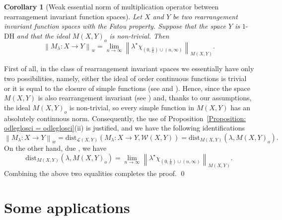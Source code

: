 \documentclass[11pt]{amsart}
\theoremstyle{definition}
\theoremstyle{definition}
\theoremstyle{definition}
\newtheorem{corollary}[theorem]{Corollary}
\theoremstyle{definition}
\theoremstyle{definition}
\theoremstyle{definition}
\theoremstyle{definition}
\theoremstyle{definition}
\numberwithin{equation}{section}
\numberwithin{equation}{section}
\numberwithin{equation}{section}
\theoremstyle{definition}
\theoremstyle{definition}
\theoremstyle{definition}
\theoremstyle{definition}
\theoremstyle{definition}
\theoremstyle{definition}
\newcommand{\norm}[1]{\left\lVert#1\right\rVert}
\renewenvironment{proof}{\noindent {\bf Proof.}}{\qed}
\begin{document}
\begin{corollary}[Weak essential norm of multiplication operator between rearrangement invariant function spaces] \label{COR: ess r.i. function}
	{\it Let $X$ and $Y$ be two rearrangement invariant function spaces with the Fatou property.
	Suppose that the space $Y$ is} $1$-DH {\it and that the ideal $M(X,Y)_o$ is non-trivial. Then}
	\begin{equation} \label{EQ: weak ess norm in r.i.}
		\norm{M_{\lambda} \colon X \rightarrow Y}_{w} = \lim\limits_{n \rightarrow \infty} \norm{\lambda^{\star} \chi_{\left( 0,\frac{1}{n} \right) \cup (n, \infty)}}_{M(X,Y)}.
	\end{equation}
\end{corollary}
\begin{proof}
	First of all, in the class of rearrangement invariant spaces we essentially have only two possibilities, namely, either the ideal of order continuous
	functions is trivial or it is equal to the closure of simple functions (see \cite[Theorem~5.5, pp.~67--68]{BS88} and \cite[Theorem~B]{KT17}). Hence,
	since the space $M(X,Y)$ is also rearrangement invariant (see \cite[Theorem~2.2(i)]{KLM12}) and, thanks to our assumptions, the ideal $M(X,Y)_o$ is non-trivial,
	so every simple function in $M(X,Y)$ has an absolutely continuous norm. Consequently, the use of Proposition~\ref{Proposition: odleglosci = odleglosci}(ii)
	is justified, and we have the following identifications
	\begin{equation*}
		\norm{M_{\lambda} \colon X \rightarrow Y}_{w} = \text{dist}_{\mathscr{L}(X,Y)}(M_{\lambda} \colon X \rightarrow Y, {\mathscr W}(X,Y))
			= \text{dist}_{M(X,Y)}(\lambda, M(X,Y)_o).
	\end{equation*}
	On the other hand, due \cite[Corollary~3.7]{KKT22}, we have
	\begin{equation*}
		\text{dist}_{M(X,Y)}(\lambda, M(X,Y)_o) = \lim\limits_{n \rightarrow \infty} \norm{\lambda^{\star} \chi_{\left( 0,\frac{1}{n} \right) \cup (n, \infty)}}_{M(X,Y)}.
	\end{equation*}
	Combining the above two equalities completes the proof.
\end{proof}

\section{{\bf Some applications}} \label{SECTION: Applications}
\end{document}
